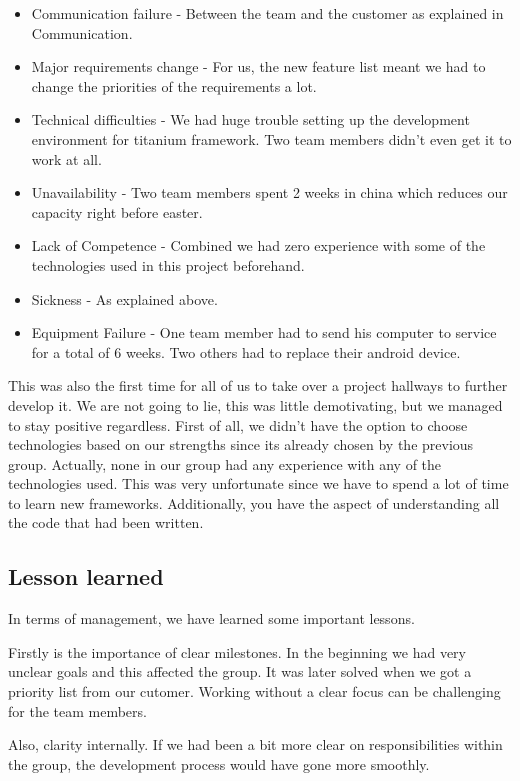\begin{itemize}
	\item Communication failure - Between the team and the customer as explained in Communication.
	\item Major requirements change - For us, the new feature list meant we had to change the priorities of the requirements a lot.
	\item Technical difficulties - We had huge trouble setting up the development environment for titanium framework. Two team members didn't even get it to work at all.
	\item Unavailability - Two team members spent 2 weeks in china which reduces our capacity right before easter. 
	\item Lack of Competence - Combined we had zero experience with some of the technologies used in this project beforehand.
	\item Sickness - As explained above.
	\item Equipment Failure - One team member had to send his computer to service for a total of 6 weeks. Two others had to replace their android device. 
\end{itemize}

This was also the first time for all of us to take over a project hallways to further develop it. We are not going to lie, this was little demotivating, but we managed to stay positive regardless. First of all, we didn't have the option to choose technologies based on our strengths since its already chosen by the previous group. Actually, none in our group had any experience with any of the technologies used. This was very unfortunate since we have to spend a lot of time to learn new frameworks. Additionally, you have the aspect of understanding all the code that had been written. 

	\subsection{Lesson learned}

In terms of management, we have learned some important lessons.

Firstly is the importance of clear milestones. In the beginning we had very unclear goals and this affected the group. It was later solved when we got a priority list from our cutomer. Working without a clear focus can be challenging for the team members.

Also, clarity internally. If we had been a bit more clear on responsibilities within the group, the development process would have gone more smoothly.

